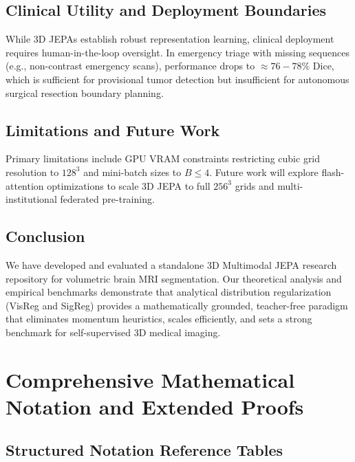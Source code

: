 \documentclass{article}
\begin{document}
\subsection{Clinical Utility and Deployment Boundaries}
While 3D JEPAs establish robust representation learning, clinical deployment requires human-in-the-loop oversight. In emergency triage with missing sequences (e.g., non-contrast emergency scans), performance drops to $\approx 76-78\%$ Dice, which is sufficient for provisional tumor detection but insufficient for autonomous surgical resection boundary planning.

\subsection{Limitations and Future Work}
Primary limitations include GPU VRAM constraints restricting cubic grid resolution to $128^3$ and mini-batch sizes to $B \le 4$. Future work will explore flash-attention optimizations to scale 3D JEPA to full $256^3$ grids and multi-institutional federated pre-training.

\subsection{Conclusion}
We have developed and evaluated a standalone 3D Multimodal JEPA research repository for volumetric brain MRI segmentation. Our theoretical analysis and empirical benchmarks demonstrate that analytical distribution regularization (VisReg and SigReg) provides a mathematically grounded, teacher-free paradigm that eliminates momentum heuristics, scales efficiently, and sets a strong benchmark for self-supervised 3D medical imaging.




\newpage
\appendix

\section{Comprehensive Mathematical Notation and Extended Proofs}

\subsection{Structured Notation Reference Tables}
\end{document}
